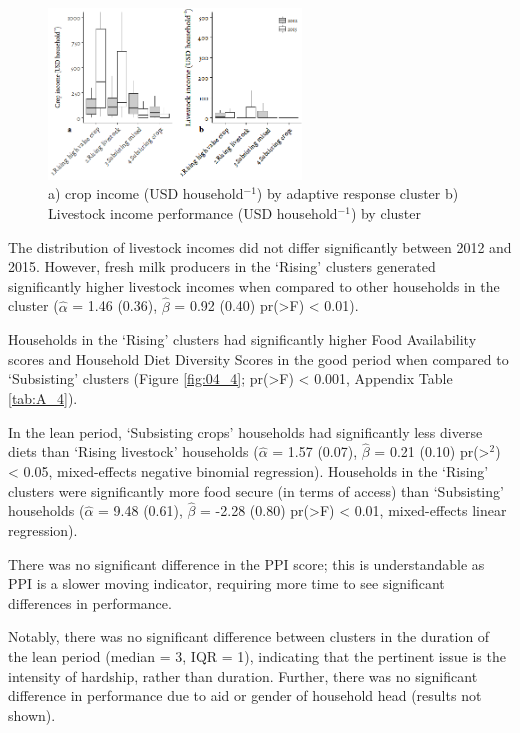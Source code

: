 \begin{figure}[H]
  \includegraphics[width=0.6\textwidth]{figs_04/image4.png}
  \captionsetup{singlelinecheck = off, justification=justified}
    \caption{a) crop income (USD household$^{-1}$) by adaptive response cluster b) Livestock income performance (USD household$^{-1}$) by cluster}
    \label{fig:04_3}
\end{figure}
\vspace*{-3mm}

The distribution of livestock incomes did not differ significantly between 2012 and 2015. However, fresh milk producers in the `Rising' clusters generated significantly higher livestock incomes when compared to other households in the cluster ($\hat{\alpha}$ = 1.46 (0.36), $\hat{\beta}$ = 0.92 (0.40) pr(\textgreater{\textbar}F{\textbar}) {\textless} 0.01).

Households in the `Rising' clusters had significantly higher Food Availability scores and Household Diet Diversity Scores in the good period when compared to `Subsisting' clusters (Figure \ref{fig:04_4}; pr(\textgreater{\textbar}F{\textbar}) {\textless} 0.001, Appendix Table \ref{tab:A_4}).

In the lean period, `Subsisting crops' households had significantly less diverse diets than `Rising livestock' households ($\hat{\alpha}$ = 1.57 (0.07), $\hat{\beta}$ = 0.21 (0.10) pr(\textgreater{\textbar}{\chi}$^2${\textbar}) {\textless} 0.05, mixed-effects negative binomial regression). Households in the `Rising' clusters were significantly more food secure (in terms of access) than `Subsisting' households ($\hat{\alpha}$ = 9.48 (0.61), $\hat{\beta}$ = -2.28 (0.80) pr(\textgreater{\textbar}F{\textbar}) {\textless} 0.01, mixed-effects linear regression).

There was no significant difference in the PPI score; this is understandable as PPI is a slower moving indicator, requiring more time to see significant differences in performance.

Notably, there was no significant difference between clusters in the duration of the lean period (median = 3, IQR = 1), indicating that the pertinent issue is the intensity of hardship, rather than duration. Further, there was no significant difference in performance due to aid or gender of household head (results not shown).

